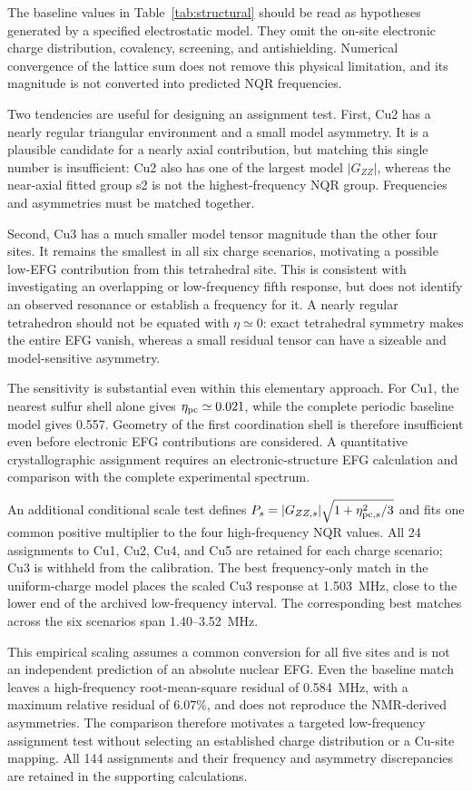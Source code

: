 The baseline values in Table~\ref{tab:structural} should be read as hypotheses generated by a specified electrostatic model. They omit the on-site electronic charge distribution, covalency, screening, and antishielding. Numerical convergence of the lattice sum does not remove this physical limitation, and its magnitude is not converted into predicted NQR frequencies.

Two tendencies are useful for designing an assignment test. First, Cu2 has a nearly regular triangular environment and a small model asymmetry. It is a plausible candidate for a nearly axial contribution, but matching this single number is insufficient: Cu2 also has one of the largest model $|G_{ZZ}|$, whereas the near-axial fitted group s2 is not the highest-frequency NQR group. Frequencies and asymmetries must be matched together.

Second, Cu3 has a much smaller model tensor magnitude than the other four sites. It remains the smallest in all six charge scenarios, motivating a possible low-EFG contribution from this tetrahedral site. This is consistent with investigating an overlapping or low-frequency fifth response, but does not identify an observed resonance or establish a frequency for it. A nearly regular tetrahedron should not be equated with $\eta\simeq0$: exact tetrahedral symmetry makes the entire EFG vanish, whereas a small residual tensor can have a sizeable and model-sensitive asymmetry.

The sensitivity is substantial even within this elementary approach. For Cu1, the nearest sulfur shell alone gives $\eta_{\rm pc}\simeq0.021$, while the complete periodic baseline model gives 0.557. Geometry of the first coordination shell is therefore insufficient even before electronic EFG contributions are considered. A quantitative crystallographic assignment requires an electronic-structure EFG calculation and comparison with the complete experimental spectrum.

An additional conditional scale test defines $P_s=|G_{ZZ,s}|\sqrt{1+\eta_{{\rm pc},s}^2/3}$ and fits one common positive multiplier to the four high-frequency NQR values. All 24 assignments to Cu1, Cu2, Cu4, and Cu5 are retained for each charge scenario; Cu3 is withheld from the calibration. The best frequency-only match in the uniform-charge model places the scaled Cu3 response at 1.503~MHz, close to the lower end of the archived low-frequency interval. The corresponding best matches across the six scenarios span 1.40--3.52~MHz.

This empirical scaling assumes a common conversion for all five sites and is not an independent prediction of an absolute nuclear EFG. Even the baseline match leaves a high-frequency root-mean-square residual of 0.584~MHz, with a maximum relative residual of 6.07\%, and does not reproduce the NMR-derived asymmetries. The comparison therefore motivates a targeted low-frequency assignment test without selecting an established charge distribution or a Cu-site mapping. All 144 assignments and their frequency and asymmetry discrepancies are retained in the supporting calculations.
